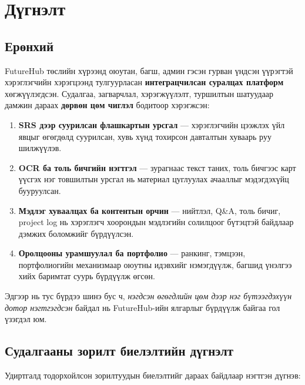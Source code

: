 \chapter{Дүгнэлт}
\label{ch:conclusion}


\section{Ерөнхий}

FutureHub төслийн хүрээнд оюутан, багш, админ гэсэн гурван үндсэн үүрэгтэй хэрэглэгчийн хэрэгцээнд тулгуурласан \textbf{интеграцчилсан суралцах платформ} хөгжүүлэгдсэн. Судалгаа, загварчлал, хэрэгжүүлэлт, туршилтын шатуудаар дамжин дараах \textbf{дөрвөн цөм чиглэл} бодитоор хэрэгжсэн:

\begin{enumerate}[label=\textbf{\arabic*.}, leftmargin=2em, itemsep=0.3em]
    \item \textbf{SRS дээр суурилсан флашкартын урсгал} --- хэрэглэгчийн цээжлэх үйл явцыг өгөгдөлд суурилсан, хувь хүнд тохирсон давталтын хуваарь руу шилжүүлэв.
    \item \textbf{OCR ба толь бичгийн нэгтгэл} --- зурагнаас текст таних, толь бичгээс карт үүсгэх нэг товшилтын урсгал нь материал цуглуулах ачааллыг мэдэгдэхүйц бууруулсан.
    \item \textbf{Мэдлэг хуваалцах ба контентын орчин} --- нийтлэл, Q\&A, толь бичиг, project log нь хэрэглэгч хоорондын мэдлэгийн солилцоог бүтэцтэй байдлаар дэмжих боломжийг бүрдүүлсэн.
    \item \textbf{Оролцооны урамшуулал ба портфолио} --- ранкинг, тэмцээн, портфолиогийн механизмаар оюутны идэвхийг нэмэгдүүлж, багшид үнэлгээ хийх баримтат суурь бүрдүүлж өгсөн.
\end{enumerate}

Эдгээр нь тус бүрдээ шинэ бус ч, \textit{нэгдсэн өгөгдлийн цөм дээр нэг бүтээгдэхүүн дотор нэгтгэгдсэн} байдал нь FutureHub-ийн ялгарлыг бүрдүүлж байгаа гол үзэгдэл юм.


\section{Судалгааны зорилт биелэлтийн дүгнэлт}

Удиртгалд тодорхойлсон зорилтуудын биелэлтийг дараах байдлаар нэгтгэн дүгнэв:

